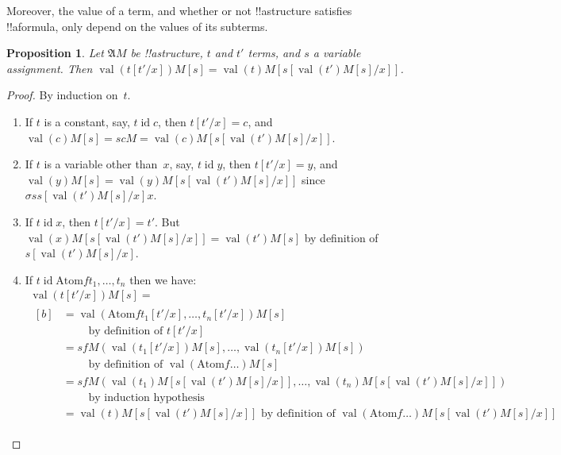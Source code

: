 \documentclass[10pt,a4paper]{article}
\theoremstyle{plain}
\newtheorem{prop}[thm]{Proposition}
\theoremstyle{definition}
\theoremstyle{remark}
\newcommand*{\ollabel}[1]{\label{#1}}
\providecommand{\Subst}[3]{#1[#2/#3]}
\providecommand{\Struct}{\ensuremath{\mathfrak{A}}}
\providecommand{\Assign}{\ensuremath{s}}
\providecommand{\Value}[1]{\operatorname{val}(#1)}
\providecommand{\Atom}{\mathrm{Atom}}
\providecommand{\ident}{\operatorname{id}}
\providecommand{\varAssign}{\sigma}
\providecommand{\varAssign}{\sigma}
\begin{document}
Moreover, the value of a term, and whether or not !!a{structure}
satisfies !!a{formula}, only depend on the values of its subterms.

\begin{prop}\ollabel{prop:ext-terms}
Let $\Struct M$ be !!a{structure}, $t$ and $t'$ terms, and $s$ a
variable assignment. Then $\Value{\Subst{t}{t'}{x}}{M}[s] =
\Value{t}{M}[\Subst{s}{\Value{t'}{M}[s]}{x}]$.
\end{prop}

\begin{proof}
By induction on~$t$.
\begin{enumerate}
\item If $t$ is a constant, say, $t\ident c$, then $\Subst{t}{t'}{x} =
  c$, and $\Value{c}{M}[s] = \Assign{c}{M} =
  \Value{c}{M}[\Subst{s}{\Value{t'}{M}[s]}{x}]$.

\item If $t$ is a variable other than~$x$, say, $t \ident y$, then
  $\Subst{t}{t'}{x} = y$, and $\Value{y}{M}[s] =
  \Value{y}{M}[\Subst{s}{\Value{t'}{M}[s]}{x}]$ since
  $\varAssign{s}{\Subst{s}{\Value{t'}{M}[s]}{x}}{x}$.

\item If $t \ident x$, then $\Subst{t}{t'}{x} = t'$. But
  $\Value{x}{M}[\Subst{s}{\Value{t'}{M}[s]}{x}] = \Value{t'}{M}[s]$ by
  definition of~$\Subst{s}{\Value{t'}{M}[s]}{x}$.

\item If $t \ident \Atom{f}{t_1,\dots,t_n}$ then we have:
\begin{multline*}
  \Value{\Subst{t}{t'}{x}}{M}[s]  = \\
  \begin{aligned}[b]
& = \Value{\Atom{f}{\Subst{t_1}{t'}{x}, \dots, \Subst{t_n}{t'}{x}}}{M}[s]\\
& \qquad    \text{ by definition of $\Subst{t}{t'}{x}$}\\
& = \Assign{f}{M}(\Value{\Subst{t_1}{t'}{x}}{M}[s], \dots,
    \Value{\Subst{t_n}{t'}{x}}{M}[s])\\
    & \qquad  \text{ by definition of $\Value{\Atom{f}{\dots}}{M}[s]$}\\
& = \Assign{f}{M}(\Value{t_1}{M}[\Subst{s}{\Value{t'}{M}[s]}{x}], \dots,
   \Value{t_n}{M}[\Subst{s}{\Value{t'}{M}[s]}{x}])\\
& \qquad    \text{ by induction hypothesis}\\
& = \Value{t}{M}[\Subst{s}{\Value{t'}{M}[s]}{x}]
    \text{ by definition of $\Value{\Atom{f}{\dots}}{M}[\Subst{s}{\Value{t'}{M}[s]}{x}]$}
  \end{aligned}
\end{multline*}
\end{enumerate}
\end{proof}
\end{document}
